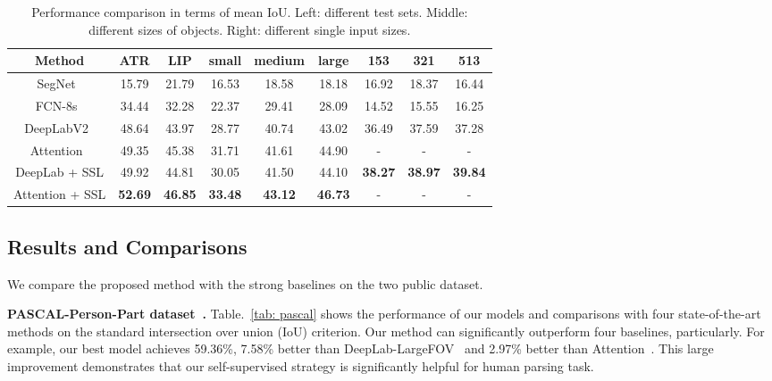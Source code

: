 \documentclass[10pt,twocolumn,letterpaper]{article}
\begin{document}
\begin{table}[]
\centering
\scriptsize
\tabcolsep 0.04in 
\begin{tabular}{c|cc|ccc|ccc}
\toprule[0.5pt]
Method                                 & ATR      & LIP       & small    & medium    & large    & 153            & 321            & 513          \\ \hline 
SegNet~\cite{badrinarayanan2015segnet} & 15.79    & 21.79     & 16.53    & 18.58     & 18.18    & 16.92          & 18.37          & 16.44        \\
FCN-8s~\cite{long2014fully}            & 34.44    & 32.28     & 22.37    & 29.41     & 28.09    & 14.52          & 15.55          & 16.25        \\ 
DeepLabV2~\cite{chen2014semantic}      & 48.64    & 43.97     & 28.77    & 40.74     & 43.02    & 36.49          & 37.59          & 37.28        \\
Attention~\cite{chen2015attention}     & 49.35    & 45.38     & 31.71    & 41.61     & 44.90    & -              & -              & -            \\ \hline
DeepLab + SSL                          & 49.92    & 44.81     & 30.05    & 41.50     & 44.10    & \textbf{38.27} & \textbf{38.97} & \textbf{39.84}  \\
Attention + SSL                        & \textbf{52.69} & \textbf{46.85} & \textbf{33.48} & \textbf{43.12} & \textbf{46.73} & -   & -      & -    \\
\toprule[0.5pt]
\end{tabular}
\vspace{-4mm}
\caption{Performance comparison in terms of mean IoU. Left: different test sets. Middle: different sizes of objects. Right: different single input sizes.}
\vspace{-6mm}
\label{tab: lip_size}
\end{table}

\subsection{Results and Comparisons}
We compare the proposed method with the strong baselines on the two public dataset.

\textbf{PASCAL-Person-Part dataset~\cite{chen2014detect}.}
Table.~\ref{tab: pascal} shows the performance of our models and comparisons with four state-of-the-art methods on the standard intersection over union (IoU) criterion. Our method can significantly outperform four baselines, particularly. For example, our best model achieves 59.36\%, 7.58\% better than DeepLab-LargeFOV~\cite{chen2014semantic} and 2.97\% better than Attention~\cite{chen2015attention}. This large improvement demonstrates that our self-supervised strategy is significantly helpful for human parsing task.
\end{document}
